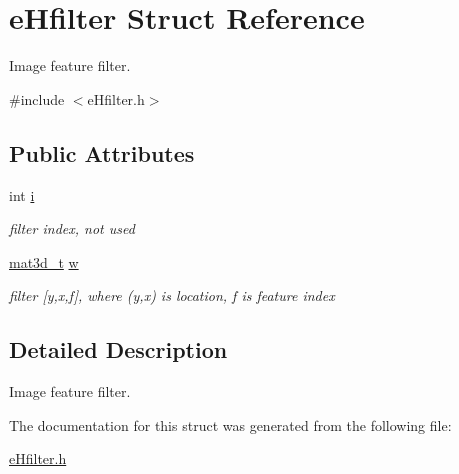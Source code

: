 \hypertarget{structeHfilter}{\section{e\-Hfilter Struct Reference}
\label{structeHfilter}
}


Image feature filter.  




{\ttfamily \#include $<$e\-Hfilter.\-h$>$}

\subsection*{Public Attributes}
\begin{DoxyCompactItemize}
\item 
\hypertarget{structeHfilter_a719271f5188e345d1b25555f90986716}{int \hyperlink{structeHfilter_a719271f5188e345d1b25555f90986716}{i}}\label{structeHfilter_a719271f5188e345d1b25555f90986716}

\begin{DoxyCompactList}\small\item\em filter index, not used \end{DoxyCompactList}\item 
\hypertarget{structeHfilter_a0c1a726fbd8ed16c1f1deac2de25eac6}{\hyperlink{eHmatrix_8h_ab963a0b30b57a23311c19a379665ac97}{mat3d\-\_\-t} \hyperlink{structeHfilter_a0c1a726fbd8ed16c1f1deac2de25eac6}{w}}\label{structeHfilter_a0c1a726fbd8ed16c1f1deac2de25eac6}

\begin{DoxyCompactList}\small\item\em filter \mbox{[}y,x,f\mbox{]}, where (y,x) is location, f is feature index \end{DoxyCompactList}\end{DoxyCompactItemize}


\subsection{Detailed Description}
Image feature filter. 

The documentation for this struct was generated from the following file\-:\begin{DoxyCompactItemize}
\item 
\hyperlink{eHfilter_8h}{e\-Hfilter.\-h}\end{DoxyCompactItemize}

